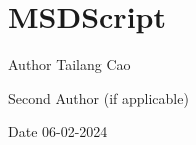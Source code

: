 \chapter{MSDScript}
\hypertarget{index}{}\label{index}
\begin{DoxyAuthor}{Author}
Tailang Cao 

Second Author (if applicable) 
\end{DoxyAuthor}
\begin{DoxyDate}{Date}
06-\/02-\/2024 
\end{DoxyDate}
